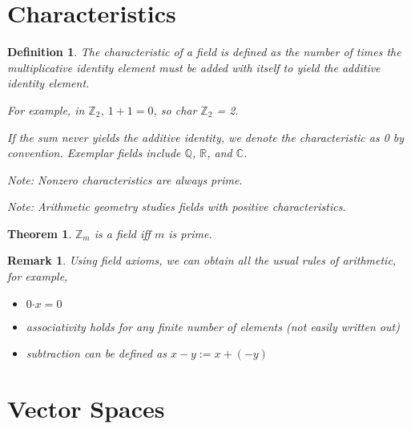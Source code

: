\documentclass[10pt, oneside]{article}
\newcommand{\R}{\mathbb{R}}
\newcommand{\C}{\mathbb{C}}
\newcommand{\Z}{\mathbb{Z}}
\newcommand{\Q}{\mathbb{Q}}
\newcommand{\Cdot}{\boldsymbol{\cdot}}
\newtheorem{thm}{Theorem}
\newtheorem{defn}{Definition}
\newtheorem{rem}{Remark}
\begin{document}
\section{Characteristics}

\begin{defn}
    The {\em characteristic} of a field is defined as the number of times the multiplicative identity element must be added with itself to yield the additive identity element.

    For example, in $\Z_2$, $1 + 1 = 0$, so {\em char $\Z_2$} = 2.

    If the sum never yields the additive identity, we denote the characteristic as 0 by convention. Exemplar fields include $\Q$, $\R$, and $\C$.

    Note: Nonzero characteristics are always prime.

    Note: Arithmetic geometry studies fields with positive characteristics.
\end{defn}

\begin{thm}
    $\Z_m$ is a field iff $m$ is prime.
\end{thm}

\begin{rem} Using field axioms, we can obtain all the usual rules of arithmetic, for example, \begin{itemize}
    \item $0 \Cdot x = 0$
    \item associativity holds for any finite number of elements (not easily written out)
    \item subtraction can be defined as $x - y := x + (-y)$
\end{itemize}
\end{rem}



\section{Vector Spaces}
\end{document}
